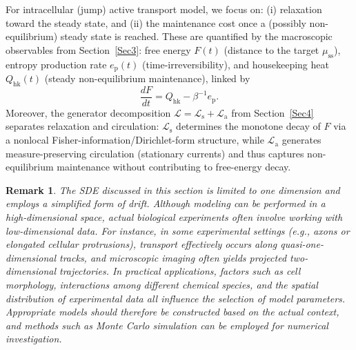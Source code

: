 \documentclass[10pt]{article}
\newtheorem{remark}{Remark}[section]
\theoremstyle{definition}
\numberwithin{equation}{section}
\begin{document}


For intracellular (jump) active transport model, we focus on: (i) relaxation toward the steady state, and (ii) the maintenance cost once a (possibly non-equilibrium) steady state is reached. 
These are quantified by the macroscopic observables from Section~\ref{Sec3}: free energy $F(t)$ (distance to the target $\mu_{\mathrm{ss}}$), entropy production rate $e_{\mathrm p}(t)$ (time-irreversibility), and housekeeping heat $Q_{\mathrm{hk}}(t)$ (steady non-equilibrium maintenance), linked by
\[
\frac{dF}{dt}=Q_{\mathrm{hk}}-\beta^{-1}e_{\mathrm p}.
\]
Moreover, the generator decomposition $\mathcal L=\mathcal L_{\mathrm s}+\mathcal L_{\mathrm a}$ from Section~\ref{Sec4} separates relaxation and circulation: $\mathcal L_{\mathrm s}$ determines the monotone decay of $F$ via a nonlocal Fisher-information/Dirichlet-form structure, while $\mathcal L_{\mathrm a}$ generates measure-preserving circulation (stationary currents) and thus captures non-equilibrium maintenance without contributing to free-energy decay.


\begin{remark}
    The SDE discussed in this section is limited to one dimension and employs a simplified form of drift. Although modeling can be performed in a high‑dimensional space, actual biological experiments often involve working with low‑dimensional data. For instance, in some experimental settings (e.g., axons or elongated cellular protrusions), transport effectively occurs along quasi-one-dimensional tracks, and microscopic imaging often yields projected two-dimensional trajectories.
    In practical applications, factors such as cell morphology, interactions among different chemical species, and the spatial distribution of experimental data all influence the selection of model parameters. Appropriate models should therefore be constructed based on the actual context, and methods such as Monte Carlo simulation can be employed for numerical investigation.
\end{remark}
\end{document}
